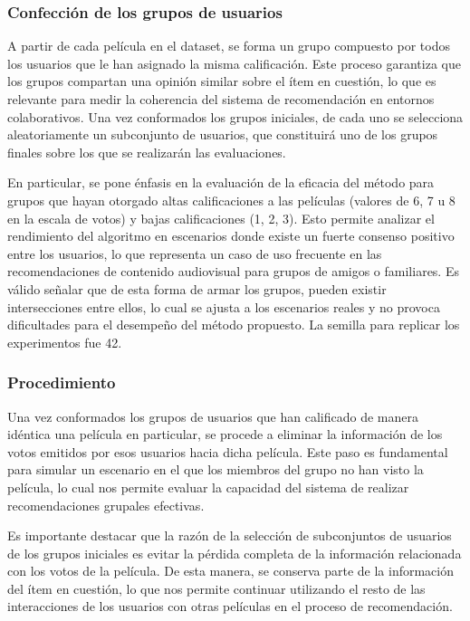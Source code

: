 \documentclass[runningheads,a4paper]{llncs}
\begin{document}
 \subsubsection{Confección de los grupos de usuarios}
 A partir de cada película en el dataset, se forma un grupo compuesto por todos los usuarios que le han asignado la misma calificación. Este proceso garantiza que los grupos compartan una opinión similar sobre el ítem en cuestión, lo que es relevante para medir la coherencia del sistema de recomendación en entornos colaborativos. Una vez conformados los grupos iniciales, de cada uno se selecciona aleatoriamente un subconjunto de usuarios, que constituirá uno de los grupos finales sobre los que se realizarán las evaluaciones.

En particular, se pone énfasis en la evaluación de la eficacia del método para grupos que hayan otorgado altas calificaciones a las películas (valores de 6, 7 u 8 en la escala de votos) y bajas calificaciones (1, 2, 3). Esto permite analizar el rendimiento del algoritmo en escenarios donde existe un fuerte consenso positivo entre los usuarios, lo que representa un caso de uso frecuente en las recomendaciones de contenido audiovisual para grupos de amigos o familiares.
Es válido señalar que de esta forma de armar los grupos, pueden existir intersecciones entre ellos, lo cual se ajusta a los escenarios reales y no provoca dificultades para el desempeño del método propuesto. La semilla para replicar los experimentos fue 42.
 
\subsubsection{Procedimiento}

Una vez conformados los grupos de usuarios que han calificado de manera idéntica una película en particular, se procede a eliminar la información de los votos emitidos por esos usuarios hacia dicha película. Este paso es fundamental para simular un escenario en el que los miembros del grupo no han visto la película, lo cual nos permite evaluar la capacidad del sistema de realizar recomendaciones grupales efectivas.

Es importante destacar que la razón de la selección de subconjuntos de usuarios de los grupos iniciales es evitar la pérdida completa de la información relacionada con los votos de la película. De esta manera, se conserva parte de la información del ítem en cuestión, lo que nos permite continuar utilizando el resto de las interacciones de los usuarios con otras películas en el proceso de recomendación.
\end{document}
